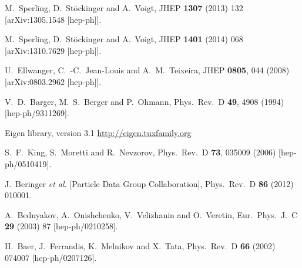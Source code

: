 \documentclass[final,3p,times,pdflatex]{elsarticle}
\begin{document}
\begin{thebibliography}{100}
  M.~Sperling, D.~Stöckinger and A.~Voigt,
  JHEP {\bf 1307} (2013) 132
  [arXiv:1305.1548 [hep-ph]].

  M.~Sperling, D.~Stöckinger and A.~Voigt,
  JHEP {\bf 1401} (2014) 068
  [arXiv:1310.7629 [hep-ph]].

  U.~Ellwanger, C.~-C.~Jean-Louis and A.~M.~Teixeira,
  JHEP {\bf 0805}, 044 (2008)
  [arXiv:0803.2962 [hep-ph]].


  V.~D.~Barger, M.~S.~Berger and P.~Ohmann,
  Phys.\ Rev.\ D {\bf 49}, 4908 (1994)
  [hep-ph/9311269].

Eigen library, version 3.1 \url{http://eigen.tuxfamily.org}

  S.~F.~King, S.~Moretti and R.~Nevzorov,
  Phys.\ Rev.\ D {\bf 73}, 035009 (2006)
  [hep-ph/0510419].

  J.~Beringer {\it et al.}  [Particle Data Group Collaboration],
  Phys.\ Rev.\ D {\bf 86} (2012) 010001.

  A.~Bednyakov, A.~Onishchenko, V.~Velizhanin and O.~Veretin,
  Eur.\ Phys.\ J.\ C {\bf 29} (2003) 87
  [hep-ph/0210258].

  H.~Baer, J.~Ferrandis, K.~Melnikov and X.~Tata,
  Phys.\ Rev.\ D {\bf 66} (2002) 074007
  [hep-ph/0207126].

\end{thebibliography}
\end{document}
